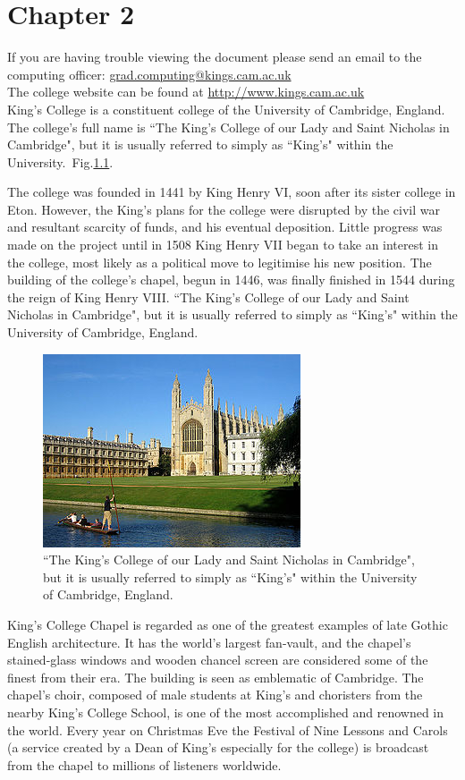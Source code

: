 \chapter{Chapter 2}

If you are having trouble viewing the document please send an email to the computing officer: \href{mailto:grad.computing@kings.cam.ac.uk}{grad.computing@kings.cam.ac.uk}\\

The college website can be found at \url{http://www.kings.cam.ac.uk}\\

King's College is a constituent college of the University of Cambridge, England. The college's full name is ``The King's College of our Lady and Saint Nicholas in Cambridge", but it is usually referred to simply as ``King's" within the University.~Fig.\ref{fig:kings}.

The college was founded in 1441 by King Henry VI, soon after its sister college in Eton. However, the King's plans for the college were disrupted by the civil war and resultant scarcity of funds, and his eventual deposition. Little progress was made on the project until in 1508 King Henry VII began to take an interest in the college, most likely as a political move to legitimise his new position. The building of the college's chapel, begun in 1446, was finally finished in 1544 during the reign of King Henry VIII.
{``The King's College of our Lady and Saint Nicholas in Cambridge", but it is usually referred to simply as ``King's" within the University of Cambridge, England.}
\begin{figure}[h]
\includegraphics[scale=0.8]{Chapter2/Figures/Kings1.jpg}
\caption[King's College]{``The King's College of our Lady and Saint Nicholas in Cambridge", but it is usually referred to simply as ``King's" within the University of Cambridge, England.}
\label{fig:kings}
\end{figure}
King's College Chapel is regarded as one of the greatest examples of late Gothic English architecture. It has the world's largest fan-vault, and the chapel's stained-glass windows and wooden chancel screen are considered some of the finest from their era. The building is seen as emblematic of Cambridge. The chapel's choir, composed of male students at King's and choristers from the nearby King's College School, is one of the most accomplished and renowned in the world. Every year on Christmas Eve the Festival of Nine Lessons and Carols (a service created by a Dean of King's especially for the college) is broadcast from the chapel to millions of listeners worldwide.


